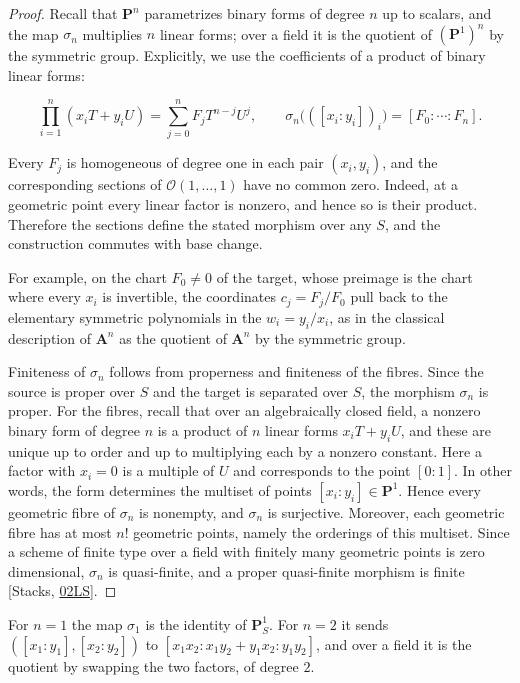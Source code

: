 \documentclass[11pt]{article}
\begin{document}
\begin{proof}[{Proof}]\label{bp373}%
Recall that \(\mathbf P^n\) parametrizes binary forms of degree \(n\) up to scalars, and the map \(\sigma_n\) multiplies \(n\) linear forms; over a field it is the quotient of \((\mathbf P^1)^n\) by the symmetric group. Explicitly, we use the coefficients of a product of binary linear forms:

\[
\prod_{i=1}^n(x_iT+y_iU)
=\sum_{j=0}^nF_jT^{n-j}U^j,\qquad
\sigma_n\bigl(([x_i:y_i])_i\bigr)=[F_0:\cdots:F_n].
\]

Every \(F_j\) is homogeneous of degree one in each pair \((x_i,y_i)\), and the corresponding sections of \(\mathcal O(1,\ldots,1)\) have no common zero. Indeed, at a geometric point every linear factor is nonzero, and hence so is their product. Therefore the sections define the stated morphism over any \(S\), and the construction commutes with base change.

For example, on the chart \(F_0\ne0\) of the target, whose preimage is the chart where every \(x_i\) is invertible, the coordinates \(c_j=F_j/F_0\) pull back to the elementary symmetric polynomials in the \(w_i=y_i/x_i\), as in the classical description of \(\mathbf A^n\) as the quotient of \(\mathbf A^n\) by the symmetric group.

Finiteness of \(\sigma_n\) follows from properness and finiteness of the fibres. Since the source is proper over \(S\) and the target is separated over \(S\), the morphism \(\sigma_n\) is proper. For the fibres, recall that over an algebraically closed field, a nonzero binary form of degree \(n\) is a product of \(n\) linear forms \(x_iT+y_iU\), and these are unique up to order and up to multiplying each by a nonzero constant. Here a factor with \(x_i=0\) is a multiple of \(U\) and corresponds to the point \([0:1]\). In other words, the form determines the multiset of points \([x_i:y_i]\in\mathbf P^1\). Hence every geometric fibre of \(\sigma_n\) is nonempty, and \(\sigma_n\) is surjective. Moreover, each geometric fibre has at most \(n!\) geometric points, namely the orderings of this multiset. Since a scheme of finite type over a field with finitely many geometric points is zero dimensional, \(\sigma_n\) is quasi-finite, and a proper quasi-finite morphism is finite [Stacks, \href{https://stacks.math.columbia.edu/tag/02LS}{02LS}].
\end{proof}

\label{bp374}%
For \(n=1\) the map \(\sigma_1\) is the identity of \(\mathbf P^1_S\). For \(n=2\) it sends \(([x_1:y_1],[x_2:y_2])\) to \([x_1x_2:x_1y_2+y_1x_2:y_1y_2]\), and over a field it is the quotient by swapping the two factors, of degree \(2\).
\end{document}
